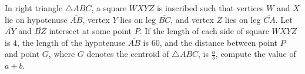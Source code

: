 In right triangle $\triangle{ABC}$,  a square $WXYZ$ is inscribed such that vertices $W$ and $X$ lie on hypotenuse $\overline{AB}$,  vertex $Y$ lies on leg $\overline{BC}$,  and vertex $Z$ lies on leg $\overline{CA}$. Let $\overline{AY}$ and $\overline{BZ}$ intersect at some point $P$. If the length of each side of square $WXYZ$ is $4$,  the length of the hypotenuse $\overline{AB}$ is $60$,  and the distance between point $P$ and point $G$,  where $G$ denotes the centroid of $\triangle{ABC}$,  is $\tfrac{a}{b}$,  compute the value of $a+b$.